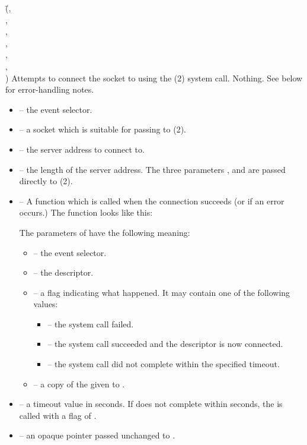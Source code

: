 \documentclass{article}
\begin{document}
{(\=,\\
  \> ,\\
  \>,\\
  \> ,\\
  \> ,\\
  \> ,\\
  \>)}
{Attempts to connect the socket  to  using the
  (2) system call.}
{Nothing.  See below for error-handling notes.}
\begin{itemize}
\item {} -- the event selector.
\item {} -- a socket which is suitable for passing to
  (2).
\item {} -- the server address to connect to.
\item {} -- the length of the server address.  The
  three parameters ,  and  are passed
  directly to (2).
\item {} -- A function which is called when the connection succeeds
  (or if an error occurs.)  The function  looks like this:

   

  The parameters of  have the following meaning:
  \begin{itemize}
  \item {} -- the event selector.
  \item {} -- the descriptor.
  \item {} -- a flag indicating what happened.  It may contain
    one of the following values:
    \begin{itemize}
    \item {} -- the  system call
      failed.
    \item {} -- the  system
      call succeeded and the descriptor is now connected.
    \item {} -- the  system call
      did not complete within the specified timeout.
    \end{itemize}
  \item {} -- a copy of the  given to
    .
  \end{itemize}
\item {} -- a timeout value in seconds.  If  does
  not complete within  seconds, the  is called
  with a flag of .
\item {} -- an opaque pointer passed unchanged to .
\end{itemize}
\end{document}

